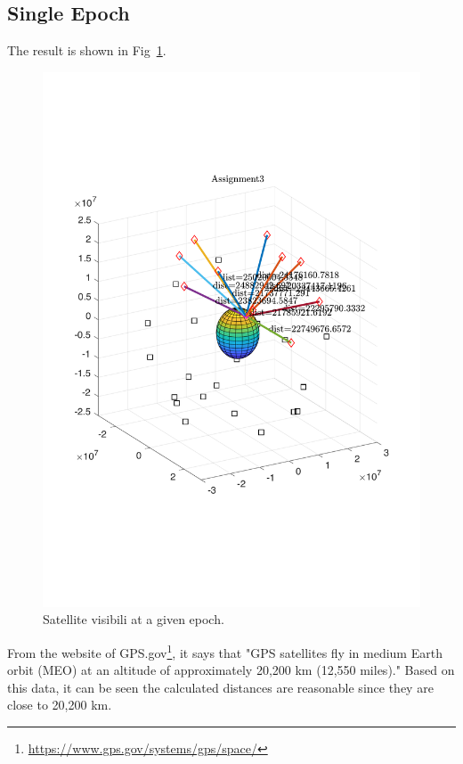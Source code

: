 \subsection{Single Epoch}
The result is shown in Fig~\ref{fig:ex31}.
\begin{figure}[h]
	\centering
	\includegraphics[width=\textwidth]{figures/ex31}
	\caption{Satellite visibili at a given epoch.}
	\label{fig:ex31}
\end{figure}
From the website of GPS.gov\footnote{\url{https://www.gps.gov/systems/gps/space/}}, it says that "GPS satellites fly in medium Earth orbit (MEO) at an altitude of approximately 20,200 km (12,550 miles)." Based on this data, it can be seen the calculated distances are reasonable since they are close to 20,200 km.

